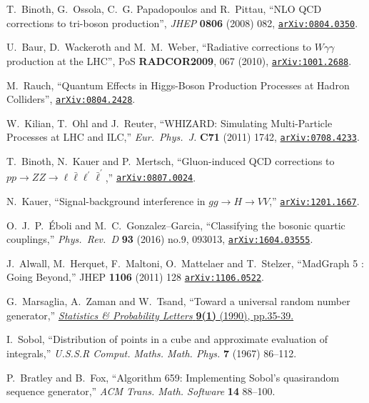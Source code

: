 \documentclass[english,12pt]{article}
\begin{document}
\begin{thebibliography}{10}
T.~Binoth, G.~Ossola, C.~G. Papadopoulos and R.~Pittau, ``{NLO QCD corrections
  to tri-boson production}'', {\em JHEP} {\bf 0806} (2008) 082,
\href{https://www.arXiv.org/abs/0804.0350}{{\tt arXiv:0804.0350}}.

  U.~Baur, D.~Wackeroth and M.~M.~Weber,
  ``{Radiative corrections to $W \gamma \gamma$ production at the LHC}'',
  PoS {\bf RADCOR2009}, 067 (2010),
\href{https://www.arXiv.org/abs/1001.2688}{{\tt arXiv:1001.2688}}.

  M.~Rauch,
  ``Quantum Effects in Higgs-Boson Production Processes at Hadron Colliders'',
 \href{https://arxiv.org/abs/0804.2428}{{\tt arXiv:0804.2428}}.

  W.~Kilian, T.~Ohl and J.~Reuter,
  ``WHIZARD: Simulating Multi-Particle Processes at LHC and ILC,''
  {\em Eur.\ Phys.\ J.} {\bf C71} (2011) 1742,
 \href{https://arxiv.org/abs/0708.4233}{{\tt arXiv:0708.4233}}.

  T.~Binoth, N.~Kauer and P.~Mertsch,
  ``Gluon-induced QCD corrections to $pp \rightarrow ZZ \rightarrow \ell \bar{\ell} \ell^{'} \bar{\ell}^{'}$,''
  \href{https://arXiv.org/abs/0807.0024}{{\tt arXiv:0807.0024}}.
  
  N.~Kauer,
  ``Signal-background interference in $gg \rightarrow H \rightarrow VV$,''
  \href{https://arXiv.org/abs/1201.1667} {{\tt arXiv:1201.1667}}.

  O.~J.~P.~Éboli and M.~C.~Gonzalez–Garcia,
  ``Classifying the bosonic quartic couplings,''
  {\em Phys.\ Rev.\ D} {\bf 93} (2016) no.9,  093013,
  \href{https://arXiv.org/abs/1604.03555} {{\tt arXiv:1604.03555}}.

  J.~Alwall, M.~Herquet, F.~Maltoni, O.~Mattelaer and T.~Stelzer,
  ``MadGraph 5 : Going Beyond,''
  JHEP {\bf 1106} (2011) 128
  \href{https://arXiv.org/abs/1106.0522}{\tt arXiv:1106.0522}.

  G.~Marsaglia, A.~Zaman and W.~Tsand, 
  ``Toward a universal random number generator,''
  \href{http://dx.doi.org/10.1016/0167-7152(90)90092-L}{{\em Statistics \& Probability
      Letters} {\bf 9(1)} (1990), pp.35-39.}

  I.~Sobol, ``Distribution of points in a cube and approximate evaluation of
   integrals,''
   {\em  U.S.S.R Comput. Maths. Math. Phys.} {\bf 7} (1967) 86–112.

  P.~Bratley and B.~Fox, ``Algorithm 659: Implementing Sobol’s quasirandom
  sequence generator,'' {\em ACM Trans. Math. Software} {\bf 14} 88–100.

\end{thebibliography}\endgroup
\end{document}
